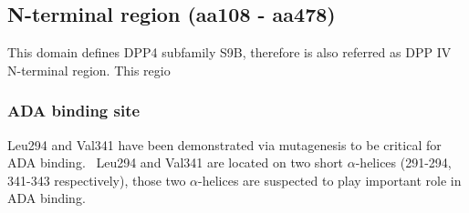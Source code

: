 \subsection{N-terminal region (aa108 - aa478)}

This domain defines DPP4 subfamily S9B, therefore is also referred as DPP IV N-terminal region. This regio 

\subsubsection{ADA binding site}
Leu294 and Val341 have been demonstrated via mutagenesis to be critical for ADA binding.~\cite{Abbott_1999} Leu294 and Val341 are located on two short $\alpha$-helices (291-294, 341-343 respectively), those two $\alpha$-helices are suspected to play important role in ADA binding. 
